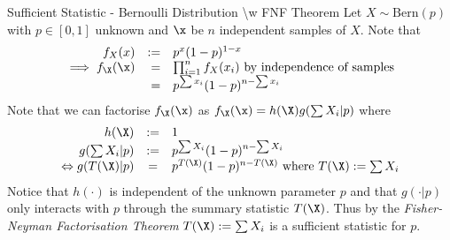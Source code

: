 \documentclass[11pt,a4paper]{article}
\begin{document}
  \begin{example}{Sufficient Statistic - Bernoulli Distribution {\textbackslash}w FNF Theorem}
    Let $X\sim\text{Bern}(p)$ with $p\in[0,1]$ unknown and $\x$ be $n$ independent samples of $X$. Note that
    \[\begin{array}{rrl}
      f_X(x)&:=&p^x(1-p)^{1-x}\\
      \implies f_\X(\x)&=&\prod_{i=1}^nf_X(x_i)\text{ by independence of samples}\\
      &=&p^{\sum x_i}(1-p)^{n-\sum x_i}
    \end{array}\]
    Note that we can factorise $f_\X(\x)$ as $f_\X(\x)=h(\X)g(\sum X_i|p)$ where
    \[\begin{array}{rcl}
      h(\X)&:=&1\\
      g(\sum X_i|p)&:=&p^{\sum X_i}(1-p)^{n-\sum X_i}\\
      \Leftrightarrow g(T(\X)|p)&=&p^{T(\X)}(1-p)^{n-T(\X)}\text{ where }T(\X):=\sum X_i
    \end{array}\]
    Notice that $h(\cdot)$ is independent of the unknown parameter $p$ and that $g(\cdot|p)$ only interacts with $p$ through the summary statistic $T(\X)$. Thus by the \textit{Fisher-Neyman Factorisation Theorem} $T(\X):=\sum X_i$ is a sufficient statistic for $p$.
  \end{example}
\end{document}
